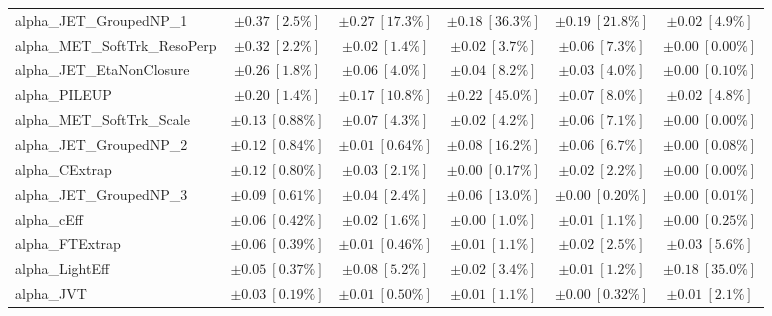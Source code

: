 \begin{sidewaystable}
\begin{center}
\begin{tabular*}{\textwidth}{@{\extracolsep{\fill}}lccccc}
alpha\_JET\_GroupedNP\_1         & $\pm 0.37\ [2.5\%] $          & $\pm 0.27\ [17.3\%] $          & $\pm 0.18\ [36.3\%] $          & $\pm 0.19\ [21.8\%] $          & $\pm 0.02\ [4.9\%] $       \\
alpha\_MET\_SoftTrk\_ResoPerp         & $\pm 0.32\ [2.2\%] $          & $\pm 0.02\ [1.4\%] $          & $\pm 0.02\ [3.7\%] $          & $\pm 0.06\ [7.3\%] $          & $\pm 0.00\ [0.00\%] $       \\
alpha\_JET\_EtaNonClosure         & $\pm 0.26\ [1.8\%] $          & $\pm 0.06\ [4.0\%] $          & $\pm 0.04\ [8.2\%] $          & $\pm 0.03\ [4.0\%] $          & $\pm 0.00\ [0.10\%] $       \\
alpha\_PILEUP         & $\pm 0.20\ [1.4\%] $          & $\pm 0.17\ [10.8\%] $          & $\pm 0.22\ [45.0\%] $          & $\pm 0.07\ [8.0\%] $          & $\pm 0.02\ [4.8\%] $       \\
alpha\_MET\_SoftTrk\_Scale         & $\pm 0.13\ [0.88\%] $          & $\pm 0.07\ [4.3\%] $          & $\pm 0.02\ [4.2\%] $          & $\pm 0.06\ [7.1\%] $          & $\pm 0.00\ [0.00\%] $       \\
alpha\_JET\_GroupedNP\_2         & $\pm 0.12\ [0.84\%] $          & $\pm 0.01\ [0.64\%] $          & $\pm 0.08\ [16.2\%] $          & $\pm 0.06\ [6.7\%] $          & $\pm 0.00\ [0.08\%] $       \\
alpha\_CExtrap         & $\pm 0.12\ [0.80\%] $          & $\pm 0.03\ [2.1\%] $          & $\pm 0.00\ [0.17\%] $          & $\pm 0.02\ [2.2\%] $          & $\pm 0.00\ [0.00\%] $       \\
alpha\_JET\_GroupedNP\_3         & $\pm 0.09\ [0.61\%] $          & $\pm 0.04\ [2.4\%] $          & $\pm 0.06\ [13.0\%] $          & $\pm 0.00\ [0.20\%] $          & $\pm 0.00\ [0.01\%] $       \\
alpha\_cEff         & $\pm 0.06\ [0.42\%] $          & $\pm 0.02\ [1.6\%] $          & $\pm 0.00\ [1.0\%] $          & $\pm 0.01\ [1.1\%] $          & $\pm 0.00\ [0.25\%] $       \\
alpha\_FTExtrap         & $\pm 0.06\ [0.39\%] $          & $\pm 0.01\ [0.46\%] $          & $\pm 0.01\ [1.1\%] $          & $\pm 0.02\ [2.5\%] $          & $\pm 0.03\ [5.6\%] $       \\
alpha\_LightEff         & $\pm 0.05\ [0.37\%] $          & $\pm 0.08\ [5.2\%] $          & $\pm 0.02\ [3.4\%] $          & $\pm 0.01\ [1.2\%] $          & $\pm 0.18\ [35.0\%] $       \\
alpha\_JVT         & $\pm 0.03\ [0.19\%] $          & $\pm 0.01\ [0.50\%] $          & $\pm 0.01\ [1.1\%] $          & $\pm 0.00\ [0.32\%] $          & $\pm 0.01\ [2.1\%] $       \\

\end{tabular*}
\end{center}
\end{sidewaystable}
